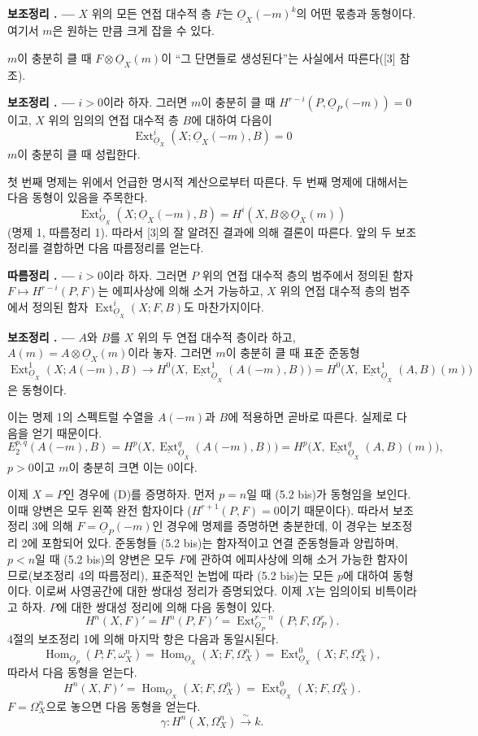 \documentclass[11pt,twoside,openany]{book}
\numberwithin{equation}{section}
\newcommand{\sourceunit}{front}
\newcommand{\src}[1]{%
  \phantomsection\hypertarget{src:\sourceunit:#1}{}%
  \marginpar{\raggedleft\footnotesize\sffamily #1}%
}
\newcommand{\Osh}{\underline{O}}
\newcommand{\Extsh}{\underline{\operatorname{Ext}}}
\theoremstyle{plain}
\theoremstyle{definition}
\theoremstyle{remark}
\newcommand{\result}[2]{%
  \par\medskip\noindent\textbf{#1%
  \if\relax\detokenize{#2}\relax\else\space#2\fi. ---}\enspace
}
\begin{document}
\result{보조정리}{3} $X$ 위의 모든 연접 대수적 층 $F$는
$\Osh_X(-m)^{k}$의 어떤 몫층과 동형이다. 여기서 $m$은 원하는 만큼
크게 잡을 수 있다.

$m$이 충분히 클 때 $F\otimes\Osh_X(m)$이 ``그 단면들로 생성된다''는
사실에서 따른다([3] 참조).

\result{보조정리}{4} $i>0$이라 하자. 그러면
$m$이 충분히 클 때 $H^{r-i}(P,\Osh_P(-m))=0$이고, $X$ 위의 임의의
연접 대수적 층 $B$에 대하여 다음이
\[
  \operatorname{Ext}_{\Osh_X}^{i}(X;\Osh_X(-m),B)=0
\]
$m$이 충분히 클 때 성립한다.

첫 번째 명제는 위에서 언급한 명시적 계산으로부터 따른다. 두 번째 명제에
대해서는 다음 동형이 있음을 주목한다.
\[
  \operatorname{Ext}_{\Osh_X}^{i}(X;\Osh_X(-m),B)
  =H^{i}(X,B\otimes\Osh_X(m))
\]
(명제 1, 따름정리 1). 따라서 [3]의 잘 알려진 결과에 의해 결론이
따른다. 앞의 두 보조정리를 결합하면 다음 따름정리를 얻는다.

\result{따름정리}{} $i>0$이라 하자. 그러면 $P$ 위의 연접 대수적 층의
범주에서 정의된 함자 $F\longmapsto H^{r-i}(P,F)$는 에피사상에 의해
소거 가능하고, $X$ 위의 연접 대수적 층의 범주에서 정의된 함자
$\operatorname{Ext}_{\Osh_X}^{i}(X;F,B)$도 마찬가지이다.

\src{184}
\result{보조정리}{5} $A$와 $B$를 $X$ 위의 두 연접 대수적 층이라 하고,
$A(m)=A\otimes\Osh_X(m)$이라 놓자. 그러면 $m$이 충분히 클 때 표준
준동형
\[
  \operatorname{Ext}_{\Osh_X}^{1}(X;A(-m),B)
  \longrightarrow H^{0}\bigl(X,\Extsh_{\Osh_X}^{1}(A(-m),B)\bigr)
  =H^{0}\bigl(X,\Extsh_{\Osh_X}^{1}(A,B)(m)\bigr)
\]
은 동형이다.

이는 명제 1의 스펙트럴 수열을 $A(-m)$과 $B$에 적용하면 곧바로 따른다.
실제로 다음을 얻기 때문이다.
\[
  E_{2}^{p,q}(A(-m),B)
  =H^{p}\bigl(X,\Extsh_{\Osh_X}^{q}(A(-m),B)\bigr)
  =H^{p}\bigl(X,\Extsh_{\Osh_X}^{q}(A,B)(m)\bigr),
\]
$p>0$이고 $m$이 충분히 크면 이는 0이다.

이제 $X=P$인 경우에 (D)를 증명하자. 먼저 $p=n$일 때 (5.2 bis)가
동형임을 보인다. 이때 양변은 모두 왼쪽 완전 함자이다
($H^{r+1}(P,F)=0$이기 때문이다). 따라서 보조정리 3에 의해
$F=\Osh_P(-m)$인 경우에 명제를 증명하면 충분한데, 이 경우는
보조정리 2에 포함되어 있다. 준동형들 (5.2 bis)는 함자적이고
연결 준동형들과 양립하며, $p<n$일 때 (5.2 bis)의 양변은 모두
$F$에 관하여 에피사상에 의해 소거 가능한 함자이므로(보조정리 4의 따름정리),
표준적인 논법에 따라 (5.2 bis)는 모든 $p$에 대하여 동형이다.
이로써 사영공간에 대한 쌍대성 정리가 증명되었다. 이제 $X$는 임의이되
비특이라고 하자. $P$에 대한 쌍대성 정리에 의해 다음 동형이 있다.
\[
  H^{n}(X,F)'=H^{n}(P,F)'
  =\operatorname{Ext}_{\Osh_P}^{r-n}(P;F,\Omega_P^{r}).
\]
4절의 보조정리 1에 의해 마지막 항은 다음과 동일시된다.
\[
  \operatorname{Hom}_{\Osh_P}(P;F,\omega_X^{n})
  =\operatorname{Hom}_{\Osh_X}(X;F,\Omega_X^{n})
  =\operatorname{Ext}_{\Osh_X}^{0}(X;F,\Omega_X^{n}),
\]
따라서 다음 동형을 얻는다.
\begin{equation}\tag{5.6}
  H^{n}(X,F)'=\operatorname{Hom}_{\Osh_X}(X;F,\Omega_X^{n})
  =\operatorname{Ext}_{\Osh_X}^{0}(X;F,\Omega_X^{n}).
\end{equation}
$F=\Omega_X^{n}$으로 놓으면 다음 동형을 얻는다.
\begin{equation}\tag{5.7}
  \gamma:H^{n}(X,\Omega_X^{n})\xrightarrow{\sim}k.
\end{equation}
\end{document}
